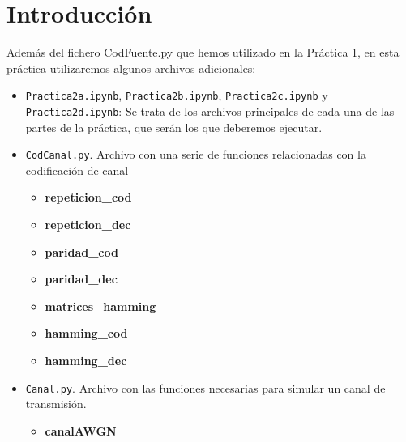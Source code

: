 \documentclass[es,practica]{uah}
\begin{document}

\maketitle

\section{Introducción}

Además del fichero CodFuente.py que hemos utilizado en la Práctica 1, en esta práctica utilizaremos algunos archivos adicionales:

\begin{itemize}
	\item \texttt{Practica2a.ipynb}, \texttt{Practica2b.ipynb}, \texttt{Practica2c.ipynb} y \texttt{Practica2d.ipynb}: Se trata de los archivos principales de cada una de las partes de la práctica, que serán los que deberemos ejecutar. 
	\item \texttt{CodCanal.py}. Archivo con una serie de funciones relacionadas con la codificación de canal
	\begin{itemize}
		\item {\bf repeticion\_cod}
		\item {\bf repeticion\_dec}
		\item {\bf paridad\_cod}
		\item {\bf paridad\_dec}
		\item {\bf matrices\_hamming}
		\item {\bf hamming\_cod}
		\item {\bf hamming\_dec}
	\end{itemize}
	\item \texttt{Canal.py}. Archivo con las funciones necesarias para simular un canal de transmisión.
	\begin{itemize}
		\item {\bf canalAWGN}
	\end{itemize}		
\end{itemize}
\end{document}
